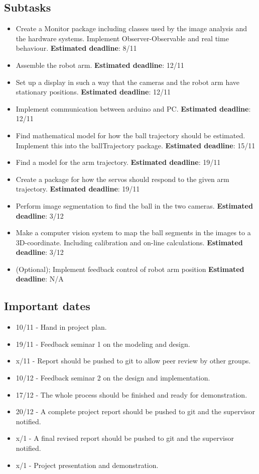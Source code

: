 \documentclass{article}
\begin{document}
\subsection{Subtasks}
    \begin{itemize}
        \item Create a Monitor package including classes used by the image analysis and the hardware systems. Implement Observer-Observable and real time behaviour. \textbf{Estimated deadline}: 8/11
        \item Assemble the robot arm. \textbf{Estimated deadline}: 12/11
        \item Set up a display in such a way that the cameras and the robot arm have stationary positions. \textbf{Estimated deadline}: 12/11
        \item Implement communication between arduino and PC. \textbf{Estimated deadline}: 12/11
        \item Find mathematical model for how the ball trajectory should be estimated. Implement this into the ballTrajectory package. \textbf{Estimated deadline}: 15/11
        \item Find a model for the arm trajectory. \textbf{Estimated deadline}: 19/11 
        
        \item Create a package for how the servos should respond to the given arm trajectory. \textbf{Estimated deadline}: 19/11
        \item Perform image segmentation to find the ball in the two cameras. \textbf{Estimated deadline}: 3/12
        \item Make a computer vision system to map the ball segments in the images to a 3D-coordinate. Including calibration and on-line calculations. \textbf{Estimated deadline}: 3/12
        \item (Optional); Implement feedback control of robot arm position \textbf{Estimated deadline}: N/A
    \end{itemize}
    
\subsection{Important dates}
    \begin{itemize}
        \item 10/11 -  Hand in project plan.
        \item 19/11 - Feedback seminar 1 on the modeling and design.
        \item x/11 - Report should be pushed to git to allow peer review by other groups.
        \item 10/12 - Feedback seminar 2 on the design and implementation.
        \item 17/12 - The whole process should be finished and ready for demonstration.
        \item 20/12 - A complete project report should be pushed to git and the supervisor notified.
        \item x/1 - A final revised report should be pushed to git and the supervisor notified.
        \item x/1 - Project presentation and demonstration.
    \end{itemize}
\end{document}
